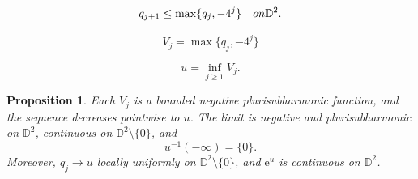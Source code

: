 \documentclass[10pt,a4paper]{amsart}
\newtheorem{proposition}{Proposition}
\newcommand{\e}{\mathrm e}
\begin{document}
\begin{equation}\label{eq:q-global}
  q_{j+1}\le\max\{q_j,-4^j\} \quad\textup{on }\mathbb D^2.
\end{equation}

\begin{equation}\label{eq:Vj}
  V_j=\max\{q_j,-4^j\}
\end{equation}

\begin{equation}\label{eq:u}
  u=\inf_{j\ge1}V_j.
\end{equation}

\begin{proposition}\label{prop:limit}
Each $V_j$ is a bounded negative plurisubharmonic function, and the sequence decreases pointwise to $u$.
The limit is negative and plurisubharmonic on $\mathbb D^2$, continuous on $\mathbb D^2\setminus\{0\}$, and
\[
  u^{-1}(-\infty)=\{0\}.
\]
Moreover, $q_j\to u$ locally uniformly on $\mathbb D^2\setminus\{0\}$, and $\e^u$ is continuous on $\mathbb D^2$.
\end{proposition}
\end{document}
